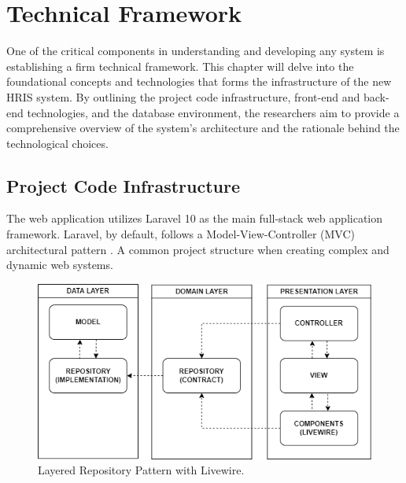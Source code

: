 \chapter{Technical Framework} 

One of the critical components in understanding and developing any system is establishing a firm technical framework. This chapter will delve into the foundational concepts and technologies that forms the infrastructure of the new HRIS system. By outlining the project code infrastructure, front-end and back-end technologies, and the database environment, the researchers aim to provide a comprehensive overview of the system's architecture and the rationale behind the technological choices. 

\section{Project Code Infrastructure}

    The web application utilizes Laravel 10 as the main full-stack web application framework. Laravel, by default, follows a Model-View-Controller (MVC) architectural pattern \cite{medium12023}. A common project structure when creating complex and dynamic web systems. 
    
    \begin{figure}[H]
        \centering
        \includegraphics[width=0.75\linewidth]{figures/images/doc/architecture.png}
        \caption{Layered Repository Pattern with Livewire.}
        \label{fig:enter-label}
    \end{figure}
    
